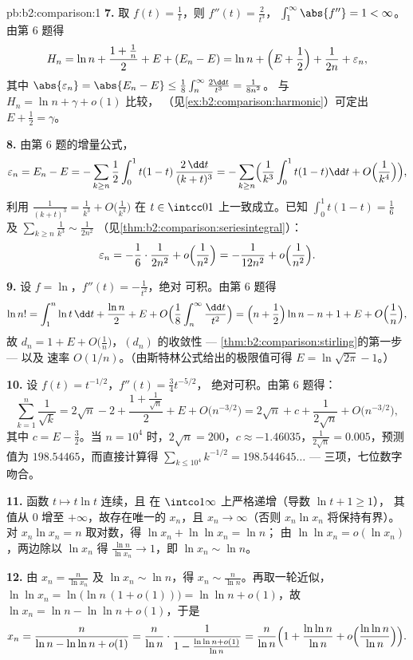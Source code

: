 \begin{solution}{pb:b2:comparison:1}
\textbf{7.} 取 $f(t) = \frac1t$，则 $f''(t) = \frac2{t^3}$，
$\int_1^\infty\abs{f''} = 1 < \infty$。由第 6 题得
\[
H_n = \ln n + \frac{1 + \frac1n}{2} + E + (E_n - E)
= \ln n + \Bigl(E + \frac12\Bigr) + \frac1{2n} +
\varepsilon_n,
\]
其中 $\abs{\varepsilon_n} = \abs{E_n - E} \leq
\frac18\int_n^\infty\frac{2\dd t}{t^3} = \frac1{8n^2}$。
与 $H_n = \ln n + \gamma + o(1)$ 比较，
（见\cref{ex:b2:comparison:harmonic}）可定出 $E + \frac12 =
\gamma$。

\textbf{8.} 由第 6 题的增量公式，
\[
\varepsilon_n = E_n - E = -\sum_{k\geq n}\frac12\int_0^1
t(1-t)\,\frac{2\,\dd t}{(k+t)^3}
= -\sum_{k \geq n}\Bigl(\frac1{k^3}\int_0^1t(1-t)\dd t +
O\Bigl(\frac1{k^4}\Bigr)\Bigr),
\]
利用 $\frac{1}{(k+t)^3} = \frac1{k^3} +
O\bigl(\frac1{k^4}\bigr)$ 在 $t \in \intcc01$ 上一致成立。已知
$\int_0^1 t(1-t) = \frac16$ 及
$\sum_{k\geq n}\frac1{k^3} \sim \frac{1}{2n^2}$
（见\cref{thm:b2:comparison:seriesintegral}）：
\[
\varepsilon_n = -\frac16\cdot\frac{1}{2n^2} +
o\Bigl(\frac1{n^2}\Bigr) = -\frac{1}{12n^2} +
o\Bigl(\frac{1}{n^2}\Bigr).
\]

\textbf{9.} 设 $f = \ln$，$f''(t) = -\frac1{t^2}$，绝对
可积。由第 6 题得
\[
\ln n! = \int_1^n\ln t\,\dd t + \frac{\ln n}2 + E + O\Bigl(
\frac1{8}\int_n^\infty\frac{\dd t}{t^2}\Bigr)
= \Bigl(n + \frac12\Bigr)\ln n - n + 1 + E +
O\Bigl(\frac1n\Bigr),
\]
故 $d_n = 1 + E + O\bigl(\frac1n\bigr)$，$(d_n)$ 的收敛性
--- \cref{thm:b2:comparison:stirling}的第一步 --- 以及
速率 $O(1/n)$。（由斯特林公式给出的极限值可得 $E =
\ln\sqrt{2\pi} - 1$。）

\textbf{10.} 设 $f(t) = t^{-1/2}$，$f''(t) = \frac34 t^{-5/2}$，
绝对可积。由第 6 题得：
\[
\sum_{k=1}^n \frac1{\sqrt k}
= 2\sqrt n - 2 + \frac{1 + \frac1{\sqrt n}}2 + E +
O\bigl(n^{-3/2}\bigr)
= 2\sqrt n + c + \frac{1}{2\sqrt n} +
O\bigl(n^{-3/2}\bigr),
\]
其中 $c = E - \frac32$。当 $n = 10^4$ 时，$2\sqrt n = 200$，$c
\approx -1.46035$，$\frac1{2\sqrt n} = 0.005$，预测值为
$198.54465$，而直接计算得 $\sum_{k\leq10^4}k^{-1/2} =
198.544645\dots$ --- 三项，七位数字吻合。

\textbf{11.} 函数 $t \mapsto t\ln t$ 连续，且
在 $\intco1\infty$ 上严格递增（导数 $\ln t + 1 \geq 1$），
其值从 $0$ 增至 $+\infty$，故存在唯一的 $x_n$，且 $x_n \to
\infty$（否则 $x_n\ln x_n$ 将保持有界）。
对 $x_n\ln x_n = n$ 取对数，得 $\ln x_n + \ln\ln x_n = \ln n$；
由 $\ln\ln x_n = o(\ln x_n)$，两边除以 $\ln x_n$ 得
$\frac{\ln n}{\ln x_n} \to 1$，即 $\ln x_n \sim \ln n$。

\textbf{12.} 由 $x_n = \frac{n}{\ln x_n}$ 及 $\ln x_n \sim
\ln n$，得 $x_n \sim \frac{n}{\ln n}$。再取一轮近似，$\ln\ln x_n =
\ln\bigl(\ln n\,(1 + o(1))\bigr) = \ln\ln n + o(1)$，故 $\ln
x_n = \ln n - \ln\ln n + o(1)$，于是
\[
x_n = \frac{n}{\ln n - \ln\ln n + o(1)}
= \frac{n}{\ln n}\cdot\frac{1}{1 - \frac{\ln\ln n +
o(1)}{\ln n}}
= \frac{n}{\ln n}\Bigl(1 + \frac{\ln\ln n}{\ln n} +
o\Bigl(\frac{\ln\ln n}{\ln n}\Bigr)\Bigr).
\]


\end{solution}
